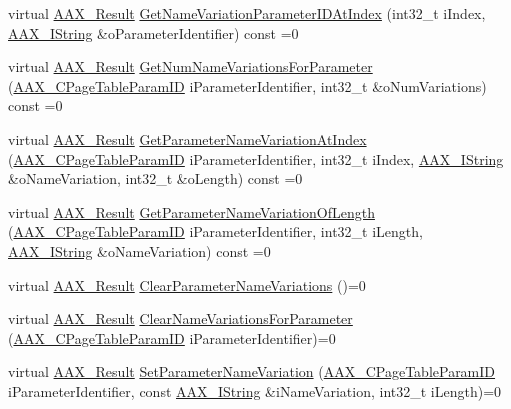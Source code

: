 \begin{DoxyCompactItemize}
\item 
virtual \hyperlink{a00149_a4d8f69a697df7f70c3a8e9b8ee130d2f}{A\+A\+X\+\_\+\+Result} \hyperlink{a00107_ac505024dd195c1965c54acac8f1f3016}{Get\+Name\+Variation\+Parameter\+I\+D\+At\+Index} (int32\+\_\+t i\+Index, \hyperlink{a00113}{A\+A\+X\+\_\+\+I\+String} \&o\+Parameter\+Identifier) const =0
\item 
virtual \hyperlink{a00149_a4d8f69a697df7f70c3a8e9b8ee130d2f}{A\+A\+X\+\_\+\+Result} \hyperlink{a00107_af8be797a3ec7ed3117e720dd29ea7cc7}{Get\+Num\+Name\+Variations\+For\+Parameter} (\hyperlink{a00149_ab4e01b971dac1b25632fd9f710dd8f77}{A\+A\+X\+\_\+\+C\+Page\+Table\+Param\+I\+D} i\+Parameter\+Identifier, int32\+\_\+t \&o\+Num\+Variations) const =0
\item 
virtual \hyperlink{a00149_a4d8f69a697df7f70c3a8e9b8ee130d2f}{A\+A\+X\+\_\+\+Result} \hyperlink{a00107_adffe5a5f2ad548bd4c704508d816d568}{Get\+Parameter\+Name\+Variation\+At\+Index} (\hyperlink{a00149_ab4e01b971dac1b25632fd9f710dd8f77}{A\+A\+X\+\_\+\+C\+Page\+Table\+Param\+I\+D} i\+Parameter\+Identifier, int32\+\_\+t i\+Index, \hyperlink{a00113}{A\+A\+X\+\_\+\+I\+String} \&o\+Name\+Variation, int32\+\_\+t \&o\+Length) const =0
\item 
virtual \hyperlink{a00149_a4d8f69a697df7f70c3a8e9b8ee130d2f}{A\+A\+X\+\_\+\+Result} \hyperlink{a00107_a6ddd61f6ba18b8be8141363d5234ed9d}{Get\+Parameter\+Name\+Variation\+Of\+Length} (\hyperlink{a00149_ab4e01b971dac1b25632fd9f710dd8f77}{A\+A\+X\+\_\+\+C\+Page\+Table\+Param\+I\+D} i\+Parameter\+Identifier, int32\+\_\+t i\+Length, \hyperlink{a00113}{A\+A\+X\+\_\+\+I\+String} \&o\+Name\+Variation) const =0
\item 
virtual \hyperlink{a00149_a4d8f69a697df7f70c3a8e9b8ee130d2f}{A\+A\+X\+\_\+\+Result} \hyperlink{a00107_a6af3965eaf2baeadef9a44aa9c77ecbb}{Clear\+Parameter\+Name\+Variations} ()=0
\item 
virtual \hyperlink{a00149_a4d8f69a697df7f70c3a8e9b8ee130d2f}{A\+A\+X\+\_\+\+Result} \hyperlink{a00107_ae6cf05c366d982e8ea92fea1d98f1d22}{Clear\+Name\+Variations\+For\+Parameter} (\hyperlink{a00149_ab4e01b971dac1b25632fd9f710dd8f77}{A\+A\+X\+\_\+\+C\+Page\+Table\+Param\+I\+D} i\+Parameter\+Identifier)=0
\item 
virtual \hyperlink{a00149_a4d8f69a697df7f70c3a8e9b8ee130d2f}{A\+A\+X\+\_\+\+Result} \hyperlink{a00107_a28643218ca7286f45c4820a020a06bf8}{Set\+Parameter\+Name\+Variation} (\hyperlink{a00149_ab4e01b971dac1b25632fd9f710dd8f77}{A\+A\+X\+\_\+\+C\+Page\+Table\+Param\+I\+D} i\+Parameter\+Identifier, const \hyperlink{a00113}{A\+A\+X\+\_\+\+I\+String} \&i\+Name\+Variation, int32\+\_\+t i\+Length)=0
\end{DoxyCompactItemize}


